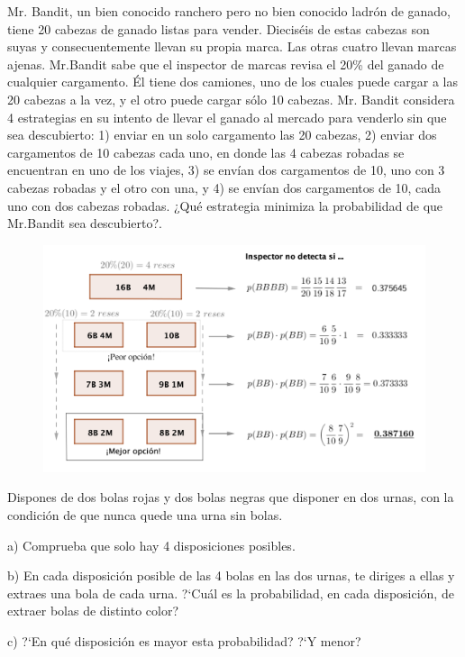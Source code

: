 \vspace{5mm}
\begin{ejemplo}
\begin{ejer}
Mr. Bandit, un bien conocido ranchero pero no bien conocido ladrón de ganado, tiene 20 cabezas de ganado listas para vender. Dieciséis de estas cabezas son suyas y consecuentemente llevan su propia marca. Las otras cuatro llevan marcas ajenas. Mr.Bandit sabe que el inspector de marcas revisa el 20\% del ganado de cualquier cargamento. Él tiene dos camiones, uno de los cuales puede cargar a las 20 cabezas a la vez, y el otro puede cargar sólo 10 cabezas. Mr. Bandit considera 4 estrategias en su intento de llevar el ganado al mercado para venderlo sin que sea descubierto: 1) enviar en un solo cargamento las 20 cabezas, 2) enviar dos cargamentos de 10 cabezas cada uno, en donde las 4 cabezas robadas se encuentran en uno de los viajes, 3) se envían dos cargamentos de 10, uno con 3 cabezas robadas y el otro con una, y 4) se envían dos cargamentos de 10, cada uno con dos cabezas robadas. ¿Qué estrategia minimiza la probabilidad de que Mr.Bandit sea descubierto?.	
\end{ejer}
\end{ejemplo}
	\begin{figure}[H]
		\centering
		\includegraphics[width=1\textwidth]{imagenes/imagenes02/T02IM45.png}
	\end{figure}



\vspace{5mm}
\begin{ejemplo}
\begin{ejer}
Dispones de dos bolas rojas y dos bolas negras que disponer en dos urnas, con la condición de que nunca quede una urna sin bolas.

a) Comprueba que solo hay 4 disposiciones posibles.

b) En cada disposición posible de las 4 bolas en las dos urnas, te diriges a  ellas y extraes una bola de cada urna. ?`Cuál es la probabilidad, en cada disposición, de extraer bolas de distinto color?

c) ?`En qué disposición es mayor esta probabilidad? ?`Y menor?
\end{ejer}
\end{ejemplo}

